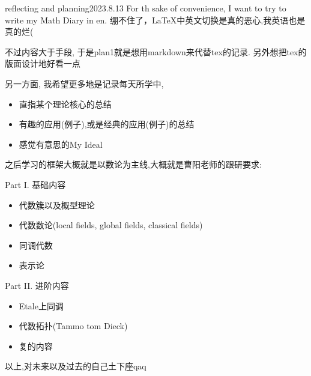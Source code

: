 \begin{diary}{reflecting and planning}{2023.8.13}
    For th sake of convenience, I want to try to write my Math Diary in en. 绷不住了，\LaTeX 中英文切换是真的恶心,我英语也是真的烂(

    不过内容大于手段, 于是plan1就是想用markdown来代替tex的记录. 另外想把tex的版面设计地好看一点

    另一方面, 我希望更多地是记录每天所学中, 
    \begin{itemize}
        \item 直指某个理论核心的总结
        \item 有趣的应用(例子),或是经典的应用(例子)的总结
        \item 感觉有意思的My Ideal
    \end{itemize}

    之后学习的框架大概就是以数论为主线,大概就是曹阳老师的跟研要求:

    Part I. 基础内容
    \begin{itemize}
        \item 代数簇以及概型理论
        \item 代数数论(local fields, global fields, classical fields)
        \item 同调代数
        \item 表示论
    \end{itemize}

    Part II. 进阶内容
    \begin{itemize}
        \item Etale上同调
        \item 代数拓扑(Tammo tom Dieck)
        \item 复的内容
    \end{itemize}

    以上,对未来以及过去的自己土下座qaq


\end{diary}